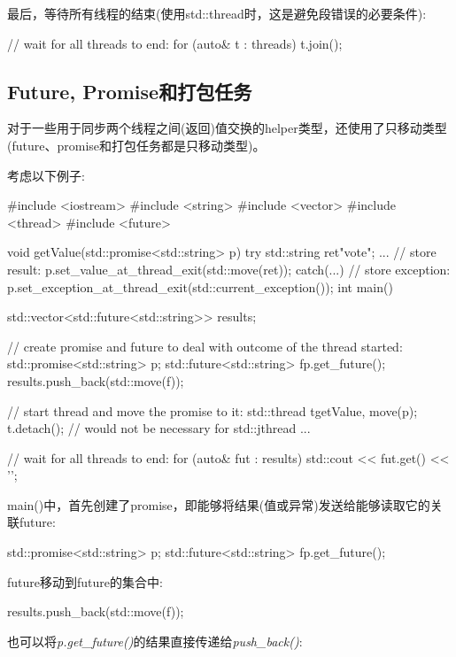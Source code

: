 最后，等待所有线程的结束(使用std::thread时，这是避免段错误的必要条件):

\begin{cppcode}
// wait for all threads to end:
for (auto& t : threads) {
	t.join();
}
\end{cppcode}

\subsection{Future, Promise和打包任务}

对于一些用于同步两个线程之间(返回)值交换的helper类型，还使用了只移动类型(future、promise和打包任务都是只移动类型)。

考虑以下例子:

\begin{cppcode}
#include <iostream>
#include <string>
#include <vector>
#include <thread>
#include <future>

void getValue(std::promise<std::string> p)
{
	try {
		std::string ret{"vote"};
		...
		// store result:
		p.set_value_at_thread_exit(std::move(ret));
	}
	catch(...) {
		// store exception:
		p.set_exception_at_thread_exit(std::current_exception());
	}
}
int main()
{
	std::vector<std::future<std::string>> results;

	// create promise and future to deal with outcome of the thread started:
	std::promise<std::string> p;
	std::future<std::string> f{p.get_future()};
	results.push_back(std::move(f));

	// start thread and move the promise to it:
	std::thread t{getValue, move(p)};
	t.detach(); // would not be necessary for std::jthread
	...

	// wait for all threads to end:
	for (auto& fut : results) {
		std::cout << fut.get() << '\n';
	}
}
\end{cppcode}

main()中，首先创建了promise，即能够将结果(值或异常)发送给能够读取它的关联future:

\begin{cppcode}
std::promise<std::string> p;
std::future<std::string> f{p.get_future()};
\end{cppcode}

future移动到future的集合中:

\begin{cppcode}
results.push_back(std::move(f));
\end{cppcode}

也可以将\textit{p.get_future()}的结果直接传递给\textit{push_back()}:

